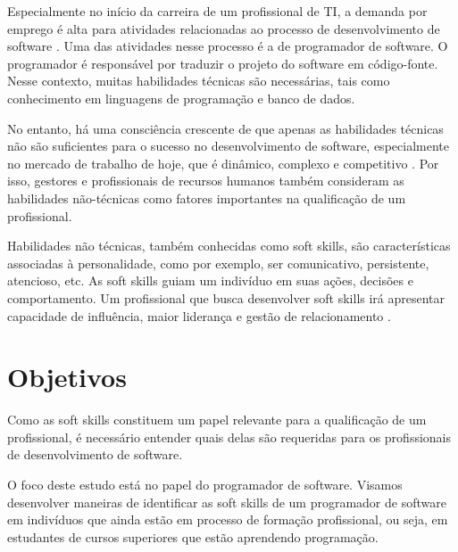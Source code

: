 
Especialmente no início da carreira de um profissional de TI, a demanda por emprego é alta para atividades relacionadas ao processo de desenvolvimento de software \cite{kennan:09}. Uma das atividades nesse processo é a de programador de software. O programador é responsável por traduzir o projeto do software em código-fonte. Nesse contexto, muitas habilidades técnicas são necessárias, tais como conhecimento em linguagens de programação e banco de dados.

No entanto, há uma consciência crescente de que apenas as habilidades técnicas não são suficientes para o sucesso no desenvolvimento de software, especialmente no mercado de trabalho de hoje, que é dinâmico, complexo e competitivo \cite{joseph:10}. Por isso, gestores e profissionais de recursos humanos também consideram as habilidades não-técnicas como fatores importantes na qualificação de um profissional.

Habilidades não técnicas, também conhecidas como soft skills, são características associadas à personalidade, como por exemplo, ser comunicativo, persistente, atencioso, etc. As soft skills guiam um indivíduo em suas ações, decisões e comportamento. Um profissional que busca desenvolver soft skills irá apresentar capacidade de influência, maior liderança e gestão de relacionamento \cite{hjyunus:12}.

\section{Objetivos}

Como as soft skills constituem um papel relevante para a qualificação de um profissional, é necessário entender quais delas são requeridas para os profissionais de desenvolvimento de software.

O foco deste estudo está no papel do programador de software. Visamos desenvolver maneiras de identificar as soft skills de um programador de software em indivíduos que ainda estão em processo de formação profissional, ou seja, em estudantes de cursos superiores que estão aprendendo programação.

